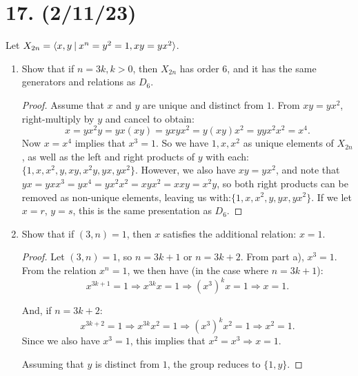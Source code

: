 \documentclass{article}
\begin{document}
\section*{17. (2/11/23)}

Let $X_{2n} = \langle x, y \hspace{0.5ex}|\hspace{0.5ex} x^n = y^2 = 1, xy = yx^2 \rangle$.

\begin{enumerate}[label=(\alph*)]
    \item Show that if $n = 3k, k > 0$, then $X_{2n}$ has order 6, and it has the same generators and relations as $D_6$.
          \begin{proof}
            Assume that $x$ and $y$ are unique and distinct from $1$. From $xy = yx^2$, right-multiply by $y$ and cancel to obtain:
            \begin{equation*}
                x = yx^2y = yx(xy) = yxyx^2 = y(xy)x^2 = yyx^2x^2 = x^4.
            \end{equation*}
            Now $x = x^4$ implies that $x^3 = 1$. So we have $1, x, x^2$ as unique elements of $X_{2n}$, as well as the left and right products of $y$ with each: $\{1, x, x^2, y, xy, x^2y, yx, yx^2\}$. However, we also have $xy = yx^2$, and note that $yx = yx x^3 = yx^4 = yx^2 x^2 = xy x^2 = xxy = x^2 y$, so both right products can be removed as non-unique elements, leaving us with:\newline $\{1, x, x^2, y, yx, yx^2\}$. If we let $x = r$, $y = s$, this is the same presentation as $D_6$.
          \end{proof}
    \item Show that if $(3, n) = 1$, then $x$ satisfies the additional relation: $x = 1$.
          \begin{proof}
            Let $(3, n) = 1$, so $n = 3k + 1$ or $n = 3k + 2$. From part a), $x^3 = 1$. From the relation $x^n = 1$, we then have (in the case where $n = 3k + 1$):
            \begin{equation*}
                x^{3k + 1} = 1 \Rightarrow x^{3k} x = 1 \Rightarrow (x^3)^k x = 1 \Rightarrow x = 1.
            \end{equation*}

            And, if $n = 3k + 2$:
            \begin{equation*}
                x^{3k + 2} = 1 \Rightarrow x^{3k} x^2 = 1 \Rightarrow (x^3)^k x^2 = 1 \Rightarrow x^2 = 1.
            \end{equation*}
            Since we also have $x^3 = 1$, this implies that $x^2 = x^3 \Rightarrow x = 1$.

            Assuming that $y$ is distinct from $1$, the group reduces to $\{1, y\}$.
          \end{proof}
\end{enumerate}
\end{document}
